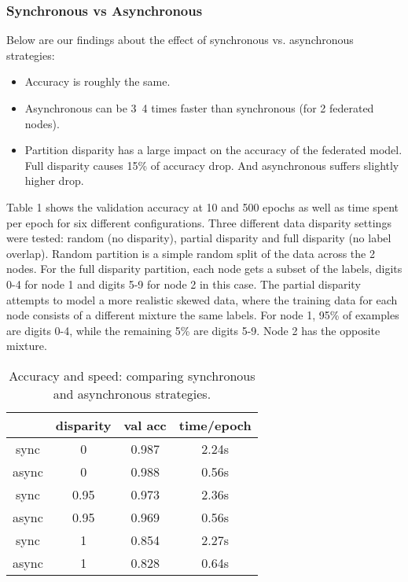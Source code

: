 \documentclass[twocolumn, switch]{article} %
\begin{document}
\subsubsection{Synchronous vs Asynchronous}

Below are our findings about the effect of synchronous vs. asynchronous strategies:

\begin{itemize}
    \item Accuracy is roughly the same.
    \item Asynchronous can be 3~4 times faster than synchronous (for 2 federated nodes).
    \item Partition disparity has a large impact on the accuracy of the federated model. Full disparity causes 15\% of accuracy drop. And asynchronous suffers slightly higher drop.
\end{itemize}


Table 1 shows the validation accuracy at 10 and 500 epochs as well as time spent per epoch for six different configurations. Three different data disparity settings were tested: random (no disparity), partial disparity and full disparity (no label overlap). Random partition is a simple random split of the data across the 2 nodes. For the full disparity partition, each node gets a subset of the labels, digits 0-4 for node 1 and digits 5-9 for node 2 in this case. The partial disparity attempts to model a more realistic skewed data, where the training data for each node consists of a different mixture the same labels. For node 1, 95\% of examples are digits 0-4, while the remaining 5\% are digits 5-9. Node 2 has the opposite mixture.


\begin{table}[H]
\begin{center}
    

\begin{tabular}{c|c|c|c}
     & disparity & val acc & time/epoch \\
    \hline
   sync & 0 & 0.987 & 2.24s \\
   async & 0 & 0.988 & 0.56s \\
   \hline
   sync & 0.95 & 0.973 & 2.36s \\
   async & 0.95 & 0.969 & 0.56s \\
   \hline
   sync & 1 & 0.854 & 2.27s \\
   async & 1 & 0.828 & 0.64s
\end{tabular}
\caption{Accuracy and speed: comparing synchronous and asynchronous strategies.}
\label{tab:mnist1}
\end{center}
\end{table}
\end{document}
